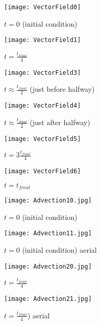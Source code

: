 \documentclass[12pt]{article}
\begin{document}
\clearpage
\begin{figure}[!tbp]
  \centering
  \begin{minipage}[b]{0.49\textwidth}
    \texttt{[image: VectorField0]}
    \caption{$t=0$ (initial condition)}
  \end{minipage}
  \hfill
  \begin{minipage}[b]{0.49\textwidth}
    \texttt{[image: VectorField1]}
    \caption{$t=\frac{t_{final}}{4}$}
  \end{minipage}
\end{figure}
\begin{figure}[!tbp]
  \centering
  \begin{minipage}[b]{0.49\textwidth}
    \texttt{[image: VectorField3]}
    \caption{$t\approx\frac{t_{final}}{2}$ (just before halfway)}
  \end{minipage}
  \hfill
  \begin{minipage}[b]{0.49\textwidth}
    \texttt{[image: VectorField4]}
    \caption{$t\approx\frac{t_{final}}{2}$ (just after halfway)}
  \end{minipage}
\end{figure}
\begin{figure}[!tbp]
  \centering
  \begin{minipage}[b]{0.49\textwidth}
    \texttt{[image: VectorField5]}
    \caption{$t=3\frac{t_{final}}{4}$}
  \end{minipage}
  \hfill
  \begin{minipage}[b]{0.49\textwidth}
    \texttt{[image: VectorField6]}
    \caption{$t=t_{final}$}
  \end{minipage}
\end{figure}
\begin{figure}[!tbp]
  \centering
  \begin{minipage}[b]{0.49\textwidth}
    \texttt{[image: Advection10.jpg]}
    \caption{$t=0$ (initial condition)}
  \end{minipage}
  \hfill
  \begin{minipage}[b]{0.49\textwidth}
    \texttt{[image: Advection11.jpg]}
    \caption{$t=0$ (initial condition) aerial}
  \end{minipage}
\end{figure}
\begin{figure}[!tbp]
  \centering
  \begin{minipage}[b]{0.49\textwidth}
    \texttt{[image: Advection20.jpg]}
    \caption{$t=\frac{t_{final}}{4}$}
  \end{minipage}
  \hfill
  \begin{minipage}[b]{0.49\textwidth}
    \texttt{[image: Advection21.jpg]}
    \caption{$t=\frac{t_{final}}{4}$) aerial}
  \end{minipage}
\end{figure}
\end{document}
